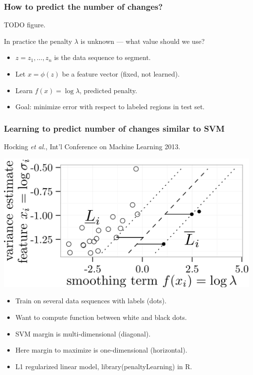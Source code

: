\documentclass{beamer}
\begin{document}
\begin{frame}
  \frametitle{How to predict the number of changes?}

  TODO figure.

  In practice the penalty $\lambda$ is unknown --- what value should we use?

\begin{itemize}
\item $z = z_1,\dots,z_n$ is the data sequence to segment.
\item Let $x = \phi(z)$ be a feature vector (fixed, not learned).
\item Learn $f(x) = \log \lambda$, predicted penalty.
\item Goal: minimize error with respect to labeled regions in test set.
\end{itemize}

\end{frame}

\begin{frame}
  \frametitle{Learning to predict number of changes similar to SVM}
  Hocking \emph{et al.}, Int'l Conference on Machine Learning 2013.

  \includegraphics[width=0.8\linewidth]{icml13-hard-margin}
  \begin{itemize}
  \item Train on several data sequences with labels (dots).
  \item Want to compute function between white and black dots.
  \item SVM margin is multi-dimensional (diagonal).
  \item Here margin to maximize is one-dimensional (horizontal).
  \item L1 regularized linear model, library(penaltyLearning) in R.
  \end{itemize}
\end{frame}

  
\end{document}

